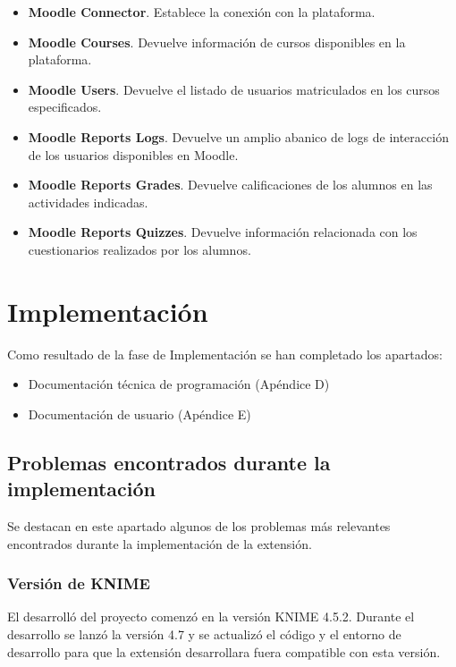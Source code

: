 \begin{itemize}
	\item \textbf{Moodle Connector}. Establece la conexión con la plataforma. 
	\item \textbf{Moodle Courses}. Devuelve información de cursos disponibles en la plataforma. 
	\item \textbf{Moodle Users}. Devuelve el listado de usuarios matriculados en los cursos especificados. 
	\item \textbf{Moodle Reports Logs}. Devuelve un amplio abanico de logs de interacción de los usuarios disponibles en Moodle. 
	\item \textbf{Moodle Reports Grades}. Devuelve calificaciones de los alumnos en las actividades indicadas. 
	\item \textbf{Moodle Reports Quizzes}. Devuelve información relacionada con los cuestionarios realizados por los alumnos. 
\end{itemize}


\newpage
\section{Implementación}

Como resultado de la fase de Implementación se han completado los apartados: 

\begin{itemize}
	\item Documentación técnica de programación (Apéndice D)
	\item Documentación de usuario (Apéndice E)
\end{itemize}


\subsection{Problemas encontrados durante la implementación}

Se destacan en este apartado algunos de los problemas más relevantes encontrados durante la implementación de la extensión. 


\subsubsection{Versión de KNIME}

El desarrolló del proyecto comenzó en la versión KNIME 4.5.2. Durante el desarrollo se lanzó la versión 4.7 
y se actualizó el código y el entorno de desarrollo para que la extensión desarrollara fuera compatible con 
esta versión. 

